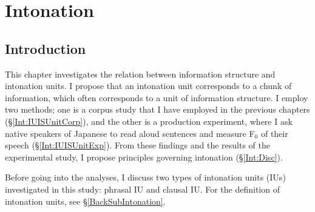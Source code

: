 \chapter{Intonation}\label{Intonation}



\section{Introduction}\label{Int:PIUCIU}

This chapter investigates the relation between information structure and intonation units.
I propose that
an intonation unit corresponds to a chunk of information, which often corresponds to a unit of information structure.
I employ two methods;
one is a corpus study that I have employed in the previous chapters (\S \ref{Int:IUISUnitCorp}),
and the other is a production experiment, where I ask native speakers of Japanese to read aloud sentences and measure F$_{0}$ of their speech (\S \ref{Int:IUISUnitExp}).
From these findings and the results of the experimental study,
I propose principles governing intonation (\S \ref{Int:Disc}).


Before going into the analyses,
I discuss two types of intonation units (IUs) investigated in this study:
phrasal IU and clausal IU.
For the definition of intonation units,
see \S \ref{BackSubIntonation}.


